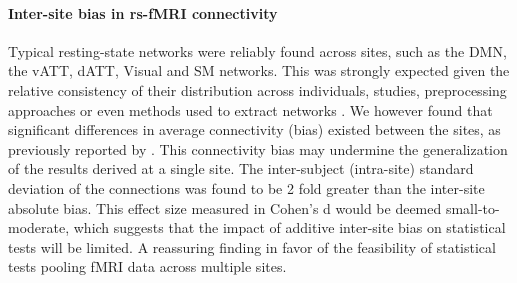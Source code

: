 \documentclass[authoryear]{elsarticle}
\begin{document}
\paragraph{Inter-site bias in rs-fMRI connectivity} Typical resting-state networks were reliably found across sites, such as the DMN, the vATT, dATT, Visual and SM networks. This was strongly expected given the relative consistency of their distribution across individuals, studies, preprocessing approaches or even methods used to extract networks \citep{Damoiseaux2006,vandeheuvel2008,Bellec2010c,Yeo2011,Power2011}. We however found that significant differences in average connectivity (bias) existed between the sites, as previously reported by \citep{Yan2013a}. This connectivity bias may undermine the generalization of the results derived at a single site. The inter-subject (intra-site) standard deviation of the connections was found to be 2 fold greater than the inter-site absolute bias. This effect size measured in Cohen's d would be deemed small-to-moderate, which suggests that the impact of additive inter-site bias on statistical tests will be limited. A reassuring finding in favor of the feasibility of statistical tests pooling fMRI data across multiple sites.\\

\end{document}
